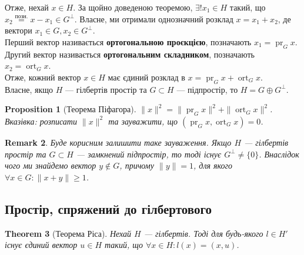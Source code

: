 \documentclass[a4paper, 10pt]{article}
\theoremstyle{theoremdd}
\newtheorem{theorem}{Theorem}[subsection]
\theoremstyle{theoremdd}
\theoremstyle{theoremdd}
\theoremstyle{theoremdd}
\theoremstyle{theoremdd}
\newtheorem{proposition}[theorem]{Proposition}
\theoremstyle{theoremdd}
\newtheorem{remark}[theorem]{Remark}
\theoremstyle{theoremdd}
\theoremstyle{theoremdd}
\DeclareMathOperator{\ort}{ort}
\DeclareMathOperator{\pr}{pr}
\begin{document}
\noindent
Отже, нехай $x \in H$. За щойно доведеною теоремою, $\exists ! x_1 \in H$ такий, що $x_2 \overset{\text{позн.}}{=} x - x_1 \in G^\perp$. Власне, ми отримали однозначний розклад $x = x_1 + x_2$, де вектори $x_1 \in G, x_2 \in G^\perp$.\\
Перший вектор називається \textbf{ортогональною проєкцією}, позначають $x_1 = \pr_G x$.\\
Другий вектор називається \textbf{ортогональним складником}, позначають $x_2 = \ort_G x$.\\
Отже, кожний вектор $x \in H$ має єдиний розклад в $x = \pr_G x + \ort_G x$.
\bigskip \\
Власне, якщо $H$ --- гілбертів простір та $G \subset H$ --- підпростір, то $H = G \oplus G^\perp$.

\begin{proposition}[Теорема Піфагора]
$\|x\|^2 = \|\pr_G x\|^2 + \|\ort_G x\|^2$.\\
\textit{Вказівка: розписати $\|x\|^2$ та зауважити, що $(\pr_G x, \ort_G x) = 0$.}
\end{proposition}

\begin{remark}
\label{equivalent_existence_of_orthogonal_unit_vector}
Буде корисним залишити таке зауваження. Якщо $H$ --- гілбертів простір та $G \subset H$ --- замкнений підпростір, то тоді існує $G^\perp \neq \{0\}$. Внаслідок чого ми знайдемо вектор $y \notin G$, причому $\|y\|=  1$, для якого $\forall x \in G: \|x+y\| \geq 1$.
\end{remark}

\subsection{Простір, спряжений до гілбертового}
\begin{theorem}[Теорема Ріса]
Нехай $H$ --- гілбертів. Тоді для будь-якого $l \in H'$ існує єдиний вектор $u \in H$ такий, що $\forall x \in H: l(x) = (x,u)$.
\end{theorem}
\end{document}
